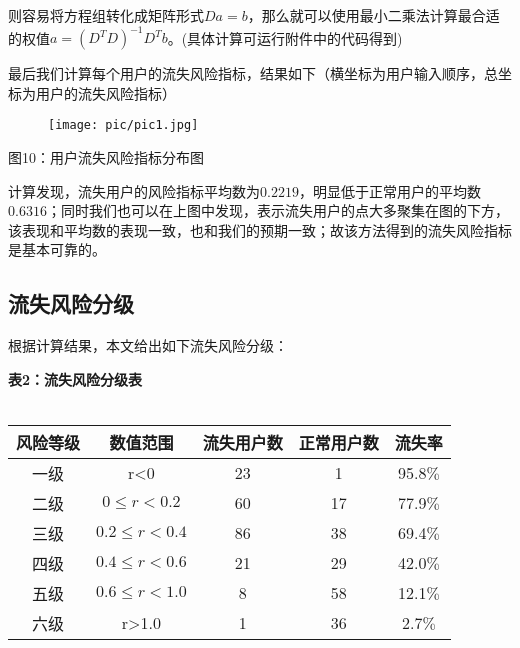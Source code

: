 \documentclass{ctexart}
\begin{document}
            则容易将方程组转化成矩阵形式$Da=b$，那么就可以使用最小二乘法计算最合适的权值$a=(D^TD)^{-1}D^Tb$。(具体计算可运行附件中的代码得到)

            最后我们计算每个用户的流失风险指标，结果如下（横坐标为用户输入顺序，总坐标为用户的流失风险指标）
            \begin{center}
                \begin{figure}[H]
                    \begin{center}
                        \texttt{[image: pic/pic1.jpg]}
                    \end{center}
                \end{figure}
                图10：用户流失风险指标分布图
            \end{center}

            计算发现，流失用户的风险指标平均数为$0.2219$，明显低于正常用户的平均数$0.6316$；同时我们也可以在上图中发现，表示流失用户的点大多聚集在图的下方，该表现和平均数的表现一致，也和我们的预期一致；故该方法得到的流失风险指标是基本可靠的。

        \subsection{流失风险分级}

        根据计算结果，本文给出如下流失风险分级：

        \begin{center}
            \textbf{表2：流失风险分级表}
            \\ \hspace*{\fill} \\

            \begin{tabular}{|c|c|c|c|c|}
                \hline
                风险等级&数值范围&流失用户数&正常用户数&流失率\\
                \hline
                一级&r<0&23&1&95.8$\%$\\
                \hline
                二级&$0\leq r<0.2$&60&17&77.9$\%$\\
                \hline
                三级&$0.2 \leq r<0.4$&86&38&69.4$\%$\\
                \hline
                四级&$0.4 \leq r<0.6$&21&29&42.0$\%$\\
                \hline
                五级&$0.6 \leq r<1.0$&8&58&12.1$\%$\\
                \hline
                六级&r>1.0&1&36&2.7$\%$\\
                \hline
            \end{tabular}\\
        \end{center}
\end{document}

